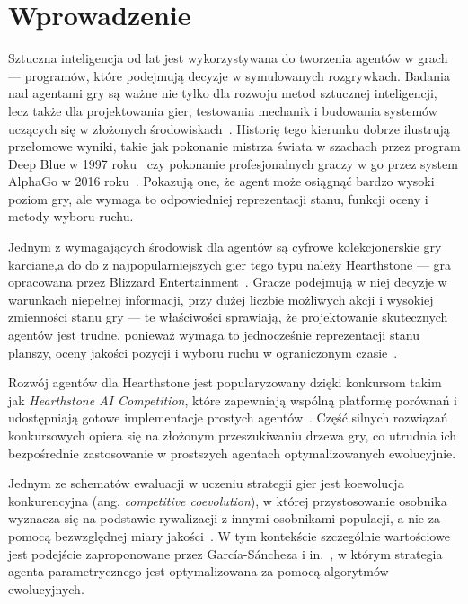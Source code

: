 \chapter{Wprowadzenie}\label{chapter:introduction}

Sztuczna inteligencja od lat jest wykorzystywana do tworzenia agentów w grach --- programów, które podejmują decyzje w symulowanych rozgrywkach. Badania nad agentami gry są ważne nie tylko dla rozwoju metod sztucznej inteligencji, lecz także dla projektowania gier, testowania mechanik i budowania systemów uczących się w złożonych środowiskach~\cite{TogeliusYannakakis2025}. Historię tego kierunku dobrze ilustrują przełomowe wyniki, takie jak pokonanie mistrza świata w szachach przez program Deep Blue w 1997 roku~\cite{campbell2002} czy pokonanie profesjonalnych graczy w go przez system AlphaGo w 2016 roku~\cite{silver2016}. Pokazują one, że agent może osiągnąć bardzo wysoki poziom gry, ale wymaga to odpowiedniej reprezentacji stanu, funkcji oceny i metody wyboru ruchu.

Jednym z wymagających środowisk dla agentów są cyfrowe kolekcjonerskie gry karciane,a do do z najpopularniejszych gier tego typu należy Hearthstone --- gra opracowana przez Blizzard Entertainment~\cite{hearthstone2014}. Gracze podejmują w niej decyzje w warunkach niepełnej informacji, przy dużej liczbie możliwych akcji i wysokiej zmienności stanu gry --- te właściwości sprawiają, że projektowanie skutecznych agentów jest trudne, ponieważ wymaga to jednocześnie reprezentacji stanu planszy, oceny jakości pozycji i wyboru ruchu w ograniczonym czasie~\cite{hoover2020}.

Rozwój agentów dla Hearthstone jest popularyzowany dzięki konkursom takim jak \textit{Hearthstone AI Competition}, które zapewniają wspólną platformę porównań i udostępniają gotowe implementacje prostych agentów~\cite{hearthstone_competition}. Część silnych rozwiązań konkursowych opiera się na złożonym przeszukiwaniu drzewa gry, co utrudnia ich bezpośrednie zastosowanie w prostszych agentach optymalizowanych ewolucyjnie.

Jednym ze schematów ewaluacji w uczeniu strategii gier jest koewolucja konkurencyjna (ang. \textit{competitive coevolution}), w której przystosowanie osobnika wyznacza się na podstawie rywalizacji z innymi osobnikami populacji, a nie za pomocą bezwzględnej miary jakości~\cite{stanley2004}. W tym kontekście szczególnie wartościowe jest podejście zaproponowane przez García-Sáncheza i in.~\cite{sanchez2020}, w którym strategia agenta parametrycznego jest optymalizowana za pomocą algorytmów ewolucyjnych.

